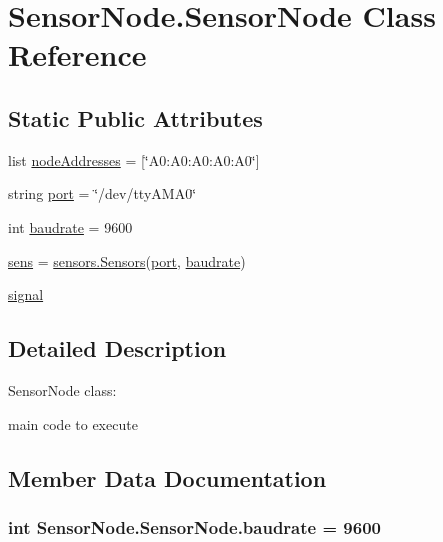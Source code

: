 \hypertarget{classSensorNode_1_1SensorNode}{}\section{Sensor\+Node.\+Sensor\+Node Class Reference}
\label{classSensorNode_1_1SensorNode}
\subsection*{Static Public Attributes}
\begin{DoxyCompactItemize}
\item 
list \hyperlink{classSensorNode_1_1SensorNode_a17be4a277b9bfdd041ec006b462d497c}{node\+Addresses} = \mbox{[}\char`\"{}A0\+:\+A0\+:\+A0\+:\+A0\+:\+A0\char`\"{}\mbox{]}
\item 
string \hyperlink{classSensorNode_1_1SensorNode_a94712cd1b0bf09fa4cd3de94ca666575}{port} = \char`\"{}/dev/tty\+A\+M\+A0\char`\"{}
\item 
int \hyperlink{classSensorNode_1_1SensorNode_a68f7a87f1d03a2734f3f6505f801a92e}{baudrate} = 9600
\item 
\hyperlink{classSensorNode_1_1SensorNode_ad8aec254c15c97a8b5c709480f31b2bb}{sens} = \hyperlink{classsensors_1_1Sensors}{sensors.\+Sensors}(\hyperlink{classSensorNode_1_1SensorNode_a94712cd1b0bf09fa4cd3de94ca666575}{port}, \hyperlink{classSensorNode_1_1SensorNode_a68f7a87f1d03a2734f3f6505f801a92e}{baudrate})
\item 
\hyperlink{classSensorNode_1_1SensorNode_a983f7af590b412918b4e0113af0388d3}{signal}
\end{DoxyCompactItemize}


\subsection{Detailed Description}
\begin{DoxyVerb}SensorNode class:

    main code to execute\end{DoxyVerb}
 

\subsection{Member Data Documentation}
\subsubsection[{\texorpdfstring{baudrate}{baudrate}}]{\setlength{\rightskip}{0pt plus 5cm}int Sensor\+Node.\+Sensor\+Node.\+baudrate = 9600\hspace{0.3cm}{\ttfamily [static]}}\hypertarget{classSensorNode_1_1SensorNode_a68f7a87f1d03a2734f3f6505f801a92e}{}\label{classSensorNode_1_1SensorNode_a68f7a87f1d03a2734f3f6505f801a92e}
